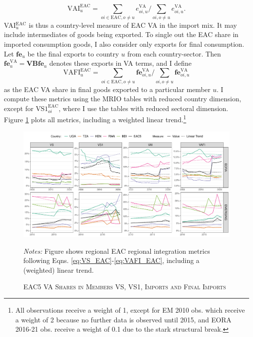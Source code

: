 \documentclass[a4paper]{article}
\begin{document}
%
\begin{equation}
\text{VAI}_u^\text{EAC} = \sum_{oi \in \text{EAC}, o \neq u}  e_{oi, u}^\text{VA}  \bigg/ \sum_{oi, o \neq u}  e_{oi, u}^\text{VA}.  
\end{equation}
%
VAI$_u^\text{EAC}$ is thus a country-level measure of EAC VA in the import mix. It may include intermediates of goods being exported. To single out the EAC share in imported consumption goods, I also consider only exports for final consumption. Let $\textbf{fe}_u$ be the final exports to country $u$ from each country-sector. Then $\textbf{fe}_u^\text{VA} = \textbf{VBfe}_u$ denotes these exports in VA terms, and I define
%
\begin{equation} \label{eq:VAFI_EAC}
\text{VAFI}_{u}^\text{EAC} = \sum_{oi \in \text{EAC}, o \neq u}  \textbf{fe}_{oi, u}^\text{VA}  \bigg/ \sum_{oi, o \neq u}  \textbf{fe}_{oi, u}^\text{VA}
\end{equation}
%
\noindent as the EAC VA share in final goods exported to a particular member $u$. I compute these metrics using the MRIO tables with reduced country dimension, except for $\text{VS1}_{oi}^\text{EAC}$, where I use the tables with reduced sectoral dimension. Figure \ref{fig:VAEACshares} plots all metrics, including a weighted linear trend.\footnote{All observations receive a weight of 1, except for EM 2010 obs. which receive a weight of 2 because no further data is observed until 2015, and EORA 2016-21 obs. receive a weight of 0.1 due to the stark structural break. \vspace{-4mm}}

\begin{figure}[h!] 
\centering
\caption{\label{fig:VAEACshares}\textsc{EAC5 VA Shares in Members VS, VS1, Imports and Final Imports}}
\includegraphics[width=1\textwidth, trim= {0 0 0 0}, clip]{"Figures/VA_EAC5_shares_ts.pdf"} \\ 
\raggedright
\scriptsize
\emph{Notes:} Figure shows regional EAC regional integration metrics following Eqns. \ref{eq:VS_EAC}-\ref{eq:VAFI_EAC}, including a (weighted) linear trend. 
\end{figure}
\FloatBarrier
\end{document}
